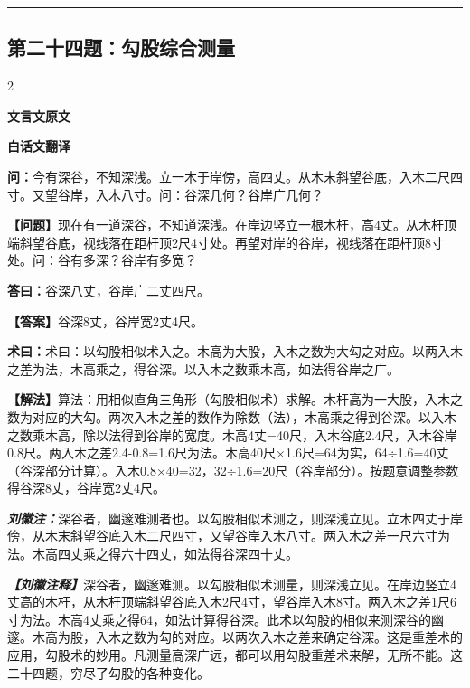 \documentclass[10pt,a4paper]{article}
\newcommand{\wen}[1]{\textbf{\color{problemcolor}问：}#1\par}
\newcommand{\da}[1]{\textbf{答曰：}#1\par}
\newcommand{\shu}[1]{\textbf{术曰：}#1\par}
\newcommand{\liuhui}[1]{{\color{commentarycolor}\textit{\textbf{刘徽注：}}#1\par}}
\newcommand{\classicalheader}[1]{{\centering\large\bfseries\color{classicalcolor} #1\par\vspace{0.5em}}}
\newcommand{\wenmodern}[1]{\textbf{\color{moderncolor}【问题】}#1\par}
\newcommand{\damodern}[1]{\textbf{【答案】}#1\par}
\newcommand{\shumodern}[1]{\textbf{【解法】}#1\par}
\newcommand{\liuhuimodern}[1]{{\color{commentarycolor}\textit{\textbf{【刘徽注释】}}#1\par}}
\newcommand{\modernheader}[1]{{\centering\large\bfseries\color{moderncolor} #1\par\vspace{0.5em}}}
\newcommand{\problemsec}[1]{\subsection*{#1}}
\begin{document}
\vspace{0.3cm}
\hrule
\vspace{0.3cm}

\problemsec{第二十四题：勾股综合测量}
\begin{paracol}{2}
\classicalheader{文言文原文}
\switchcolumn
\modernheader{白话文翻译}
\switchcolumn*

\wen{今有深谷，不知深浅。立一木于岸傍，高四丈。从木末斜望谷底，入木二尺四寸。又望谷岸，入木八寸。问：谷深几何？谷岸广几何？}

\switchcolumn

\wenmodern{现在有一道深谷，不知道深浅。在岸边竖立一根木杆，高4丈。从木杆顶端斜望谷底，视线落在距杆顶2尺4寸处。再望对岸的谷岸，视线落在距杆顶8寸处。问：谷有多深？谷岸有多宽？}

\switchcolumn*

\da{谷深八丈，谷岸广二丈四尺。}

\switchcolumn

\damodern{谷深8丈，谷岸宽2丈4尺。}

\switchcolumn*

\shu{术曰：以勾股相似术入之。木高为大股，入木之数为大勾之对应。以两入木之差为法，木高乘之，得谷深。以入木之数乘木高，如法得谷岸之广。}

\switchcolumn

\shumodern{算法：用相似直角三角形（勾股相似术）求解。木杆高为一大股，入木之数为对应的大勾。两次入木之差的数作为除数（法），木高乘之得到谷深。以入木之数乘木高，除以法得到谷岸的宽度。木高4丈=40尺，入木谷底2.4尺，入木谷岸0.8尺。两入木之差2.4-0.8=1.6尺为法。木高40尺×1.6尺=64为实，64÷1.6=40丈（谷深部分计算）。入木0.8×40=32，32÷1.6=20尺（谷岸部分）。按题意调整参数得谷深8丈，谷岸宽2丈4尺。}

\switchcolumn*

\liuhui{深谷者，幽邃难测者也。以勾股相似术测之，则深浅立见。立木四丈于岸傍，从木末斜望谷底入木二尺四寸，又望谷岸入木八寸。两入木之差一尺六寸为法。木高四丈乘之得六十四丈，如法得谷深四十丈。}

\switchcolumn

\liuhuimodern{深谷者，幽邃难测。以勾股相似术测量，则深浅立见。在岸边竖立4丈高的木杆，从木杆顶端斜望谷底入木2尺4寸，望谷岸入木8寸。两入木之差1尺6寸为法。木高4丈乘之得64，如法计算得谷深。此术以勾股的相似来测深谷的幽邃。木高为股，入木之数为勾的对应。以两次入木之差来确定谷深。这是重差术的应用，勾股术的妙用。凡测量高深广远，都可以用勾股重差术来解，无所不能。这二十四题，穷尽了勾股的各种变化。}

\end{paracol}
\end{document}
